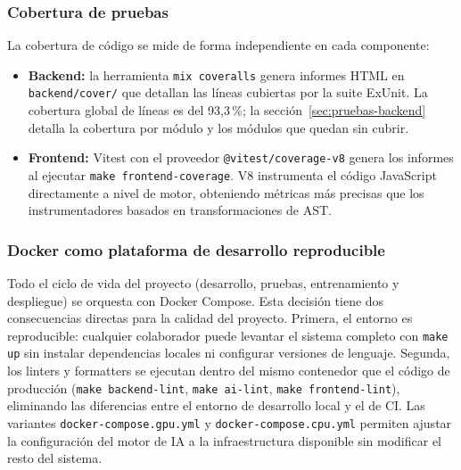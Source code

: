 \subsubsection{Cobertura de pruebas}

La cobertura de código se mide de forma independiente en cada componente:

\begin{itemize}
 \item \textbf{Backend:} la herramienta \texttt{mix coveralls} genera informes HTML en \texttt{backend/cover/} que detallan las líneas cubiertas por la suite ExUnit. La cobertura global de líneas es del 93,3\,\%; la sección~\ref{sec:pruebas-backend} detalla la cobertura por módulo y los módulos que quedan sin cubrir.
 \item \textbf{Frontend:} Vitest con el proveedor \texttt{@vitest/coverage-v8} genera los informes al ejecutar \texttt{make frontend-coverage}. V8 instrumenta el código JavaScript directamente a nivel de motor, obteniendo métricas más precisas que los instrumentadores basados en transformaciones de AST.
\end{itemize}

\subsubsection{Docker como plataforma de desarrollo reproducible}

Todo el ciclo de vida del proyecto (desarrollo, pruebas, entrenamiento y despliegue) se orquesta con Docker Compose. Esta decisión tiene dos consecuencias directas para la calidad del proyecto. Primera, el entorno es reproducible: cualquier colaborador puede levantar el sistema completo con \texttt{make up} sin instalar dependencias locales ni configurar versiones de lenguaje. Segunda, los linters y formatters se ejecutan dentro del mismo contenedor que el código de producción (\texttt{make backend-lint}, \texttt{make ai-lint}, \texttt{make frontend-lint}), eliminando las diferencias entre el entorno de desarrollo local y el de CI. Las variantes \texttt{docker-compose.gpu.yml} y \texttt{docker-compose.cpu.yml} permiten ajustar la configuración del motor de IA a la infraestructura disponible sin modificar el resto del sistema.
